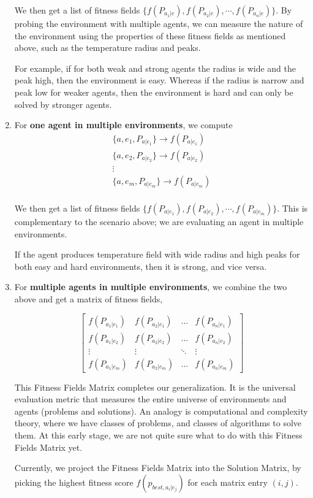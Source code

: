 \documentclass[12pt]{article}
\begin{document}
\begin{enumerate}
  We then get a list of fitness fields $\{f(P_{a_1|e}), f(P_{a_2|e}), \cdots, f(P_{a_n|e})\}$. By probing the environment with multiple agents, we can measure the nature of the environment using the properties of these fitness fields as mentioned above, such as the temperature radius and peaks.

  For example, if for both weak and strong agents the radius is wide and the peak high, then the environment is easy. Whereas if the radius is narrow and peak low for weaker agents, then the environment is hard and can only be solved by stronger agents.

  
  \item For \textbf{one agent in multiple environments}, we compute
  \begin{align*}
  \{a, e_1, P_{a|e_1}\} \longrightarrow f(P_{a|e_1}) \\
  \{a, e_2, P_{a|e_2}\} \longrightarrow f(P_{a|e_2}) \\
  \vdots \\
  \{a, e_m, P_{a|e_m}\} \longrightarrow f(P_{a|e_m}) \\
  \end{align*}

  We then get a list of fitness fields $\{f(P_{a|e_1}), f(P_{a|e_2}), \cdots, f(P_{a|e_m})\}$. This is complementary to the scenario above; we are evaluating an agent in multiple environments.

  If the agent produces temperature field with wide radius and high peaks for both easy and hard environments, then it is strong, and vice versa.

  \pagebreak

  \item For \textbf{multiple agents in multiple environments}, we combine the two above and get a matrix of fitness fields,

  \[
  \begin{bmatrix}
      f(P_{a_1|e_1}) & f(P_{a_2|e_1}) & \hdots & f(P_{a_n|e_1}) \\
      f(P_{a_1|e_2}) & f(P_{a_2|e_2}) & \hdots & f(P_{a_n|e_2}) \\
      \vdots         & \vdots         & \ddots & \vdots         \\
      f(P_{a_1|e_m}) & f(P_{a_2|e_m}) & \hdots & f(P_{a_n|e_m})
  \end{bmatrix}
  \]

  This Fitness Fields Matrix completes our generalization. It is the universal evaluation metric that measures the entire universe of environments and agents (problems and solutions). An analogy is computational and complexity theory, where we have classes of problems, and classes of algorithms to solve them. At this early stage, we are not quite sure what to do with this Fitness Fields Matrix yet.

  Currently, we project the Fitness Fields Matrix into the Solution Matrix, by picking the highest fitness score $f(p_{best, a_i|e_j})$ for each matrix entry $(i, j)$.



\end{enumerate}
\end{document}
